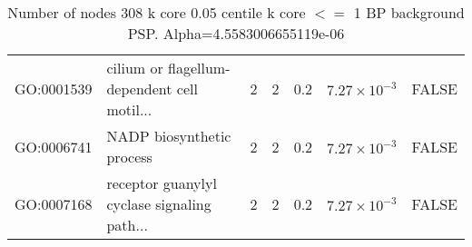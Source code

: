 \begin{table}[ht]
\begin{tabular}{llrrrrl}
  GO:0001539 & cilium or flagellum-dependent cell motil... & 2 & 2 & 0.2 & $7.27 \times 10^{-3}$ & FALSE \\ 
  GO:0006741 & NADP biosynthetic process & 2 & 2 & 0.2 & $7.27 \times 10^{-3}$ & FALSE \\ 
  GO:0007168 & receptor guanylyl cyclase signaling path... & 2 & 2 & 0.2 & $7.27 \times 10^{-3}$ & FALSE \\ 
   \hline
\end{tabular}
\caption{Number of nodes 308 k core 0.05 centile  k core $<=$ 1 BP background PSP. Alpha=4.5583006655119e-06} 
\label{tab:Number of nodes 308 k core 0.05 centile  k core $<=$ 1 BP background PSP. Alpha=4.5583006655119e-06}
\end{table}


